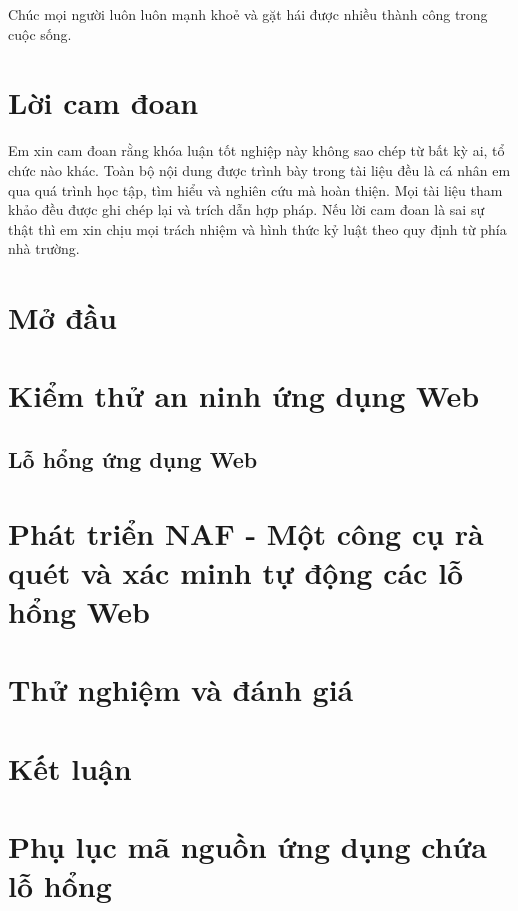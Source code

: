 \documentclass[12pt,a4paper]{report}
\begin{document}
Chúc mọi người luôn luôn mạnh khoẻ và gặt hái được nhiều thành công trong cuộc sống.

\chapter*{Lời cam đoan}

Em xin cam đoan rằng khóa luận tốt nghiệp này không sao chép từ bất kỳ ai,
tổ chức nào khác. Toàn bộ nội dung được trình bày trong tài liệu đều là cá nhân em qua quá
trình học tập, tìm hiểu và nghiên cứu mà hoàn thiện. Mọi tài liệu tham khảo đều được ghi chép
lại và trích dẫn hợp pháp. Nếu lời cam đoan là sai sự thật thì em xin chịu mọi trách nhiệm và
hình thức kỷ luật theo quy định từ phía nhà trường.

\tableofcontents{}
\clearpage{}

\listoffigures{}

\listoftables{}

\lstlistoflistings

\chapter{Mở đầu}



\chapter{Kiểm thử an ninh ứng dụng Web}

\section{Lỗ hổng ứng dụng Web}


\chapter{Phát triển NAF - Một công cụ rà quét và xác minh tự động các lỗ hổng Web}


\chapter{Thử nghiệm và đánh giá}


\chapter{Kết luận}


\appendix
\chapter{Phụ lục mã nguồn ứng dụng chứa lỗ hổng}




\nocite{*}
\printbibliography[heading=bibintoc, title=Tài liệu tham khảo]

\end{document}
